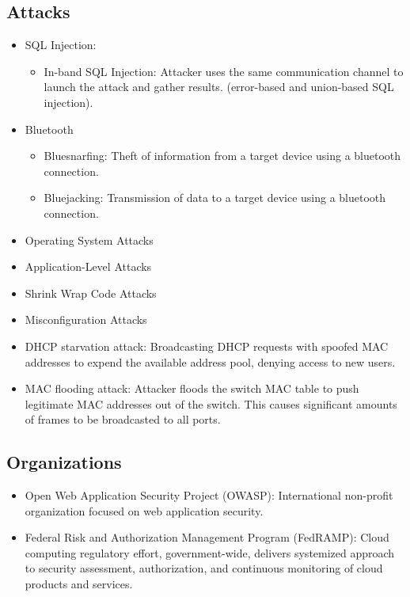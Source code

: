\subsection{Attacks}
\begin{itemize}
    \item SQL Injection:
	\begin{itemize}
        \item In-band SQL Injection: Attacker uses the same communication channel to launch the attack and gather results. (error-based and union-based SQL injection).
    \end{itemize}
    \item Bluetooth
    \begin{itemize}
        \item Bluesnarfing: Theft of information from a target device using a bluetooth connection.
        \item Bluejacking: Transmission of data to a target device using a bluetooth connection.
    \end{itemize}
    \item Operating System Attacks
    \item Application-Level Attacks
    \item Shrink Wrap Code Attacks
    \item Misconfiguration Attacks
    \item DHCP starvation attack: Broadcasting DHCP requests with spoofed MAC addresses to expend the available address pool, denying access to new users.
    \item MAC flooding attack: Attacker floods the switch MAC table to push legitimate MAC addresses out of the switch. This causes significant amounts of frames to be broadcasted to all ports.
\end{itemize}

\subsection{Organizations}
\begin{itemize}
    \item Open Web Application Security Project (OWASP): International non-profit organization focused on web application security.
    \item Federal Risk and Authorization Management Program (FedRAMP): Cloud computing regulatory effort, government-wide, delivers systemized approach to security assessment, authorization, and continuous monitoring of cloud products and services.
\end{itemize}

